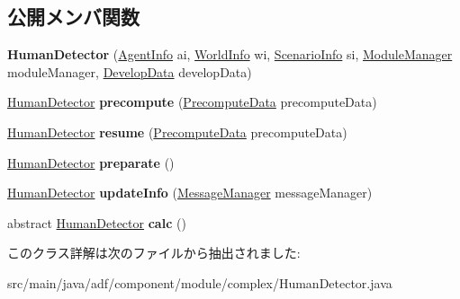 \subsection*{公開メンバ関数}
\begin{DoxyCompactItemize}
\item 
\hypertarget{classadf_1_1component_1_1module_1_1complex_1_1HumanDetector_a2fa3bdb5a88a7d55effd8d52456bfe10}{}\label{classadf_1_1component_1_1module_1_1complex_1_1HumanDetector_a2fa3bdb5a88a7d55effd8d52456bfe10} 
{\bfseries Human\+Detector} (\hyperlink{classadf_1_1agent_1_1info_1_1AgentInfo}{Agent\+Info} ai, \hyperlink{classadf_1_1agent_1_1info_1_1WorldInfo}{World\+Info} wi, \hyperlink{classadf_1_1agent_1_1info_1_1ScenarioInfo}{Scenario\+Info} si, \hyperlink{classadf_1_1agent_1_1module_1_1ModuleManager}{Module\+Manager} module\+Manager, \hyperlink{classadf_1_1agent_1_1develop_1_1DevelopData}{Develop\+Data} develop\+Data)
\item 
\hypertarget{classadf_1_1component_1_1module_1_1complex_1_1HumanDetector_ab47c656ca788a903f142c7acaf437d9a}{}\label{classadf_1_1component_1_1module_1_1complex_1_1HumanDetector_ab47c656ca788a903f142c7acaf437d9a} 
\hyperlink{classadf_1_1component_1_1module_1_1complex_1_1HumanDetector}{Human\+Detector} {\bfseries precompute} (\hyperlink{classadf_1_1agent_1_1precompute_1_1PrecomputeData}{Precompute\+Data} precompute\+Data)
\item 
\hypertarget{classadf_1_1component_1_1module_1_1complex_1_1HumanDetector_a0deb5c736dac813b9a571688e1218e69}{}\label{classadf_1_1component_1_1module_1_1complex_1_1HumanDetector_a0deb5c736dac813b9a571688e1218e69} 
\hyperlink{classadf_1_1component_1_1module_1_1complex_1_1HumanDetector}{Human\+Detector} {\bfseries resume} (\hyperlink{classadf_1_1agent_1_1precompute_1_1PrecomputeData}{Precompute\+Data} precompute\+Data)
\item 
\hypertarget{classadf_1_1component_1_1module_1_1complex_1_1HumanDetector_aea55da5c1b5dda0fff0d44b75338d43e}{}\label{classadf_1_1component_1_1module_1_1complex_1_1HumanDetector_aea55da5c1b5dda0fff0d44b75338d43e} 
\hyperlink{classadf_1_1component_1_1module_1_1complex_1_1HumanDetector}{Human\+Detector} {\bfseries preparate} ()
\item 
\hypertarget{classadf_1_1component_1_1module_1_1complex_1_1HumanDetector_aa55c3e8f4333ac8b4ce854e72e1f21e5}{}\label{classadf_1_1component_1_1module_1_1complex_1_1HumanDetector_aa55c3e8f4333ac8b4ce854e72e1f21e5} 
\hyperlink{classadf_1_1component_1_1module_1_1complex_1_1HumanDetector}{Human\+Detector} {\bfseries update\+Info} (\hyperlink{classadf_1_1agent_1_1communication_1_1MessageManager}{Message\+Manager} message\+Manager)
\item 
\hypertarget{classadf_1_1component_1_1module_1_1complex_1_1HumanDetector_adf87547c196640d7d7f12599aff53841}{}\label{classadf_1_1component_1_1module_1_1complex_1_1HumanDetector_adf87547c196640d7d7f12599aff53841} 
abstract \hyperlink{classadf_1_1component_1_1module_1_1complex_1_1HumanDetector}{Human\+Detector} {\bfseries calc} ()
\end{DoxyCompactItemize}


このクラス詳解は次のファイルから抽出されました\+:\begin{DoxyCompactItemize}
\item 
src/main/java/adf/component/module/complex/Human\+Detector.\+java\end{DoxyCompactItemize}
